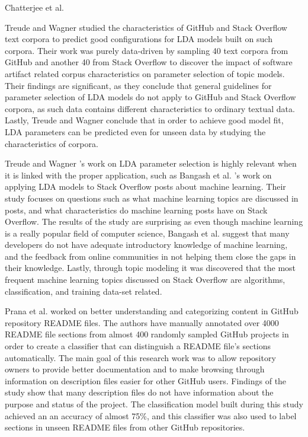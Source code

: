         Chatterjee et al.\cite{chatterjee2019exploratory}
        
        Treude and Wagner \cite{treude2019predicting} studied the characteristics of GitHub and Stack Overflow text corpora to predict good configurations for LDA models built on such corpora. Their work was purely data-driven by sampling 40 text corpora from GitHub and another 40 from Stack Overflow to discover the impact of software artifact related corpus characteristics on parameter selection of topic models. Their findings are significant, as they conclude that general guidelines for parameter selection of LDA models do not apply to GitHub and Stack Overflow corpora, as such data contains different characteristics to ordinary textual data. Lastly, Treude and Wagner conclude that in order to achieve good model fit, LDA parameters can be predicted even for unseen data by studying the characteristics of corpora.
        
         Treude and Wagner \cite{treude2019predicting}'s work on LDA parameter selection is highly relevant when it is linked with the proper application, such as Bangash et al. \cite{bangash2019developers}'s work on applying LDA models to Stack Overflow posts about machine learning. Their study focuses on questions such as what machine learning topics are discussed in posts, and what characteristics do machine learning posts have on Stack Overflow. The results of the study are surprising as even though machine learning is a really popular field of computer science, Bangash et al. suggest that many developers do not have adequate introductory knowledge of machine learning, and the feedback from online communities in not helping them close the gaps in their knowledge. Lastly, through topic modeling it was discovered that the most frequent machine learning topics discussed on Stack Overflow are algorithms, classification, and training data-set related.
        
        Prana et al. \cite{prana2019categorizing} worked on better understanding and categorizing content in GitHub repository README files. The authors have manually annotated over 4000 README file sections from almost 400 randomly sampled GitHub projects in order to create a classifier that can distinguish a README file's sections automatically. The main goal of this research work was to allow repository owners to provide better documentation and to make browsing through information on description files easier for other GitHub users. Findings of the study show that many description files do not have information about the purpose and status of the project. The classification model built during this study achieved an an accuracy of almost 75\%, and this classifier was also used to label sections in unseen README files from other GitHub repositories.

